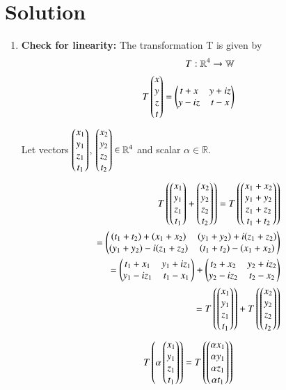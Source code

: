 \documentclass[journal,12pt,twocolumn]{IEEEtran}
\numberwithin{table}{section}
\begin{document}
\section{Solution}
\begin{enumerate}
\item \textbf{Check for linearity:}
The transformation T is given by
\begin{align}
T:\mathbb{R}^4\rightarrow\mathbb{W}\\
T\begin{pmatrix}x\\y\\z\\t\end{pmatrix}=\begin{pmatrix}t+x&y+iz\\y-iz&t-x\end{pmatrix}
\end{align}
Let vectors $\begin{pmatrix}x_1\\y_1\\z_1\\t_1\end{pmatrix}$, $\begin{pmatrix}x_2\\y_2\\z_2\\t_2\end{pmatrix} \in \mathbb{R}^4$ and scalar $\alpha\in\mathbb{R}$.
\begin{align}
T\left(\begin{pmatrix}x_1\\y_1\\z_1\\t_1\end{pmatrix}+\begin{pmatrix}x_2\\y_2\\z_2\\t_2\end{pmatrix}\right)
=T\left(\begin{pmatrix}x_1+x_2\\y_1+y_2\\z_1+z_2\\t_1+t_2\end{pmatrix}\right)\\
=\begin{pmatrix}(t_1+t_2)+(x_1+x_2)&(y_1+y_2)+i(z_1+z_2)\\(y_1+y_2)-i(z_1+z_2)&(t_1+t_2)-(x_1+x_2)\end{pmatrix}\\
=\begin{pmatrix}t_1+x_1&y_1+iz_1\\y_1-iz_1&t_1-x_1\end{pmatrix}+\begin{pmatrix}t_2+x_2&y_2+iz_2\\y_2-iz_2&t_2-x_2\end{pmatrix}\\
=T\left(\begin{pmatrix}x_1\\y_1\\z_1\\t_1\end{pmatrix}\right)+T\left(\begin{pmatrix}x_2\\y_2\\z_2\\t_2\end{pmatrix}\right) \label{vecadd}
\end{align}
\begin{align}
T\brak{\alpha\myvec{x_1\\y_1\\z_1\\t_1}}=T\brak{\myvec{\alpha x_1\\\alpha y_1\\\alpha z_1\\\alpha t_1}}\\

\end{align}
\end{enumerate}
\end{document}
